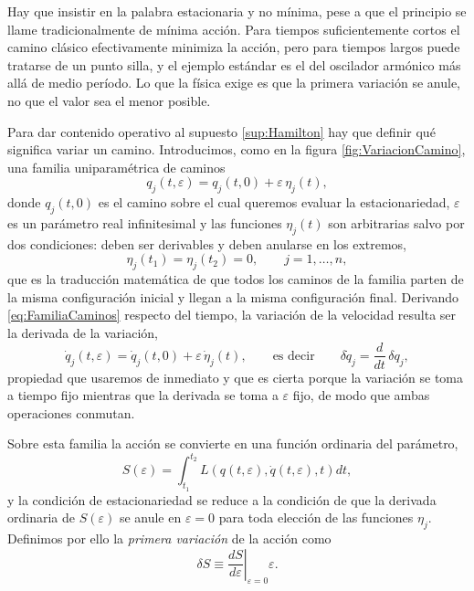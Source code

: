         Hay que insistir en la palabra estacionaria y no mínima, pese a que el principio se llame tradicionalmente de mínima acción. Para tiempos suficientemente cortos el camino clásico efectivamente minimiza la acción, pero para tiempos largos puede tratarse de un punto silla, y el ejemplo estándar es el del oscilador armónico más allá de medio período. Lo que la física exige es que la primera variación se anule, no que el valor sea el menor posible.

        Para dar contenido operativo al supuesto \ref{sup:Hamilton} hay que definir qué significa variar un camino. Introducimos, como en la figura \ref{fig:VariacionCamino}, una familia uniparamétrica de caminos
        \begin{equation}\label{eq:FamiliaCaminos}
            q_{j}(t,\varepsilon) = q_{j}(t,0) + \varepsilon\,\eta_{j}(t),
        \end{equation}
        donde $q_{j}(t,0)$ es el camino sobre el cual queremos evaluar la estacionariedad, $\varepsilon$ es un parámetro real infinitesimal y las funciones $\eta_{j}(t)$ son arbitrarias salvo por dos condiciones: deben ser derivables y deben anularse en los extremos,
        \begin{equation}\label{eq:ExtremosFijos}
            \eta_{j}(t_{1}) = \eta_{j}(t_{2}) = 0, \qquad j = 1,\ldots,n,
        \end{equation}
        que es la traducción matemática de que todos los caminos de la familia parten de la misma configuración inicial y llegan a la misma configuración final. Derivando \eqref{eq:FamiliaCaminos} respecto del tiempo, la variación de la velocidad resulta ser la derivada de la variación,
        \begin{equation}\label{eq:VariacionVelocidad}
            \dot{q}_{j}(t,\varepsilon) = \dot{q}_{j}(t,0) + \varepsilon\,\dot{\eta}_{j}(t),
            \qquad\text{es decir}\qquad
            \delta\dot{q}_{j} = \frac{d}{dt}\,\delta q_{j},
        \end{equation}
        propiedad que usaremos de inmediato y que es cierta porque la variación se toma a tiempo fijo mientras que la derivada se toma a $\varepsilon$ fijo, de modo que ambas operaciones conmutan.

        Sobre esta familia la acción se convierte en una función ordinaria del parámetro,
        \begin{equation}\label{eq:AccionEpsilon}
            S(\varepsilon) = \int_{t_{1}}^{t_{2}} L\left(q(t,\varepsilon),\dot{q}(t,\varepsilon),t\right)dt,
        \end{equation}
        y la condición de estacionariedad se reduce a la condición de que la derivada ordinaria de $S(\varepsilon)$ se anule en $\varepsilon = 0$ para toda elección de las funciones $\eta_{j}$. Definimos por ello la \textit{primera variación} de la acción como
        \begin{equation}\label{eq:PrimeraVariacion}
            \delta S \equiv \left.\frac{dS}{d\varepsilon}\right|_{\varepsilon=0}\varepsilon .
        \end{equation}

